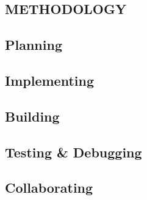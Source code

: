 \documentclass[report.tex]{subfiles}
\begin{document}
\begin{large}
    \section{METHODOLOGY}
    \subsection{Planning}
    \subsection{Implementing}
    \subsection{Building}
    \subsection{Testing \& Debugging}
    \subsection{Collaborating}
\end{large}
\end{document}
